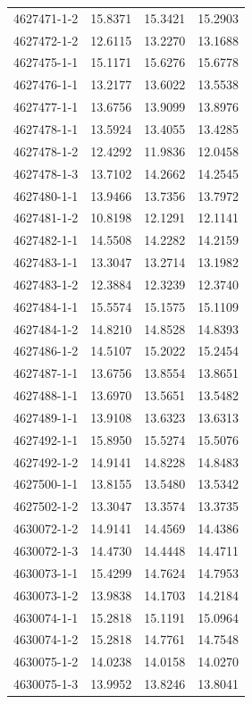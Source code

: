 \begin{longtable}{lrrr}
4627471-1-2 & 15.8371 & 15.3421 & 15.2903 \\
4627472-1-2 & 12.6115 & 13.2270 & 13.1688 \\
4627475-1-1 & 15.1171 & 15.6276 & 15.6778 \\
4627476-1-1 & 13.2177 & 13.6022 & 13.5538 \\
4627477-1-1 & 13.6756 & 13.9099 & 13.8976 \\
4627478-1-1 & 13.5924 & 13.4055 & 13.4285 \\
4627478-1-2 & 12.4292 & 11.9836 & 12.0458 \\
4627478-1-3 & 13.7102 & 14.2662 & 14.2545 \\
4627480-1-1 & 13.9466 & 13.7356 & 13.7972 \\
4627481-1-2 & 10.8198 & 12.1291 & 12.1141 \\
4627482-1-1 & 14.5508 & 14.2282 & 14.2159 \\
4627483-1-1 & 13.3047 & 13.2714 & 13.1982 \\
4627483-1-2 & 12.3884 & 12.3239 & 12.3740 \\
4627484-1-1 & 15.5574 & 15.1575 & 15.1109 \\
4627484-1-2 & 14.8210 & 14.8528 & 14.8393 \\
4627486-1-2 & 14.5107 & 15.2022 & 15.2454 \\
4627487-1-1 & 13.6756 & 13.8554 & 13.8651 \\
4627488-1-1 & 13.6970 & 13.5651 & 13.5482 \\
4627489-1-1 & 13.9108 & 13.6323 & 13.6313 \\
4627492-1-1 & 15.8950 & 15.5274 & 15.5076 \\
4627492-1-2 & 14.9141 & 14.8228 & 14.8483 \\
4627500-1-1 & 13.8155 & 13.5480 & 13.5342 \\
4627502-1-2 & 13.3047 & 13.3574 & 13.3735 \\
4630072-1-2 & 14.9141 & 14.4569 & 14.4386 \\
4630072-1-3 & 14.4730 & 14.4448 & 14.4711 \\
4630073-1-1 & 15.4299 & 14.7624 & 14.7953 \\
4630073-1-2 & 13.9838 & 14.1703 & 14.2184 \\
4630074-1-1 & 15.2818 & 15.1191 & 15.0964 \\
4630074-1-2 & 15.2818 & 14.7761 & 14.7548 \\
4630075-1-2 & 14.0238 & 14.0158 & 14.0270 \\
4630075-1-3 & 13.9952 & 13.8246 & 13.8041 \\

\end{longtable}
